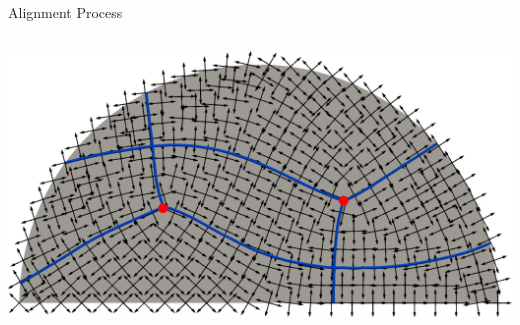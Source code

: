 \documentclass[compress,10pt,aspectratio=169]{beamer}
\begin{document}
\begin{frame}{Alignment Process}
\begin{columns}
\begin{column}{0.32\textwidth}
    \centering
    \includegraphics[scale=0.09]{images/mode_prop_stream_non_align_beam.pdf}
\end{column}
\end{columns}
\end{frame}
\end{document}
